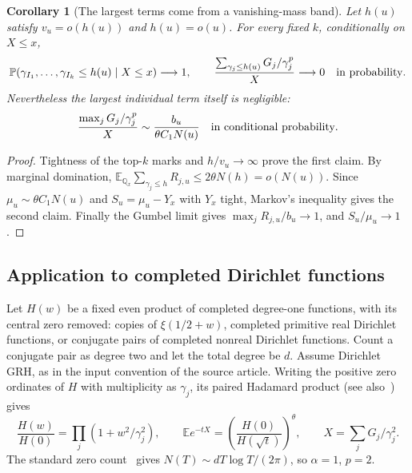 \documentclass[11pt]{article}
\newtheorem{corollary}[theorem]{Corollary}
\theoremstyle{definition}
\theoremstyle{remark}
\begin{document}
\begin{corollary}[The largest terms come from a vanishing-mass band]
\label{ext:cor:vanishingmass}
Let $h(u)$ satisfy $v_u=o(h(u))$ and $h(u)=o(u)$.  For every fixed $k$,
conditionally on $X\le x$,
\[
 \mathbb P(\gamma_{I_1},\ldots,\gamma_{I_k}\le h(u)\mid X\le x)
       \longrightarrow1,
 \qquad
 \frac{\sum_{\gamma_j\le h(u)}G_j/\gamma_j^p}{X}
       \longrightarrow0
 \quad\hbox{in probability}.
\]
Nevertheless the largest individual term itself is negligible:
\[
 \frac{\max_jG_j/\gamma_j^p}{X}
       \sim\frac{b_u}{\theta C_1N(u)}
 \quad\hbox{in conditional probability}.
\]
\end{corollary}

\begin{proof}
Tightness of the top-$k$ marks and $h/v_u\to\infty$ prove the first
claim.  By marginal domination,
$\mathbb E_{\mathbb Q_x}\sum_{\gamma_j\le h}R_{j,u}
 \le2\theta N(h)=o(N(u))$.
Since $\mu_u\sim\theta C_1N(u)$ and
$S_u=\mu_u-Y_x$ with $Y_x$ tight, Markov's inequality gives the second
claim.  Finally the Gumbel limit gives
$\max_jR_{j,u}/b_u\to1$, and $S_u/\mu_u\to1$.
\end{proof}

\subsection{Application to completed Dirichlet functions}

Let $H(w)$ be a fixed even product of completed degree-one functions,
with its central zero removed: copies of
$\xi(1/2+w)$, completed primitive real Dirichlet functions, or conjugate
pairs of completed nonreal Dirichlet functions.  Count a conjugate pair
as degree two and let the total degree be $d$.
Assume Dirichlet GRH, as in the input convention of the source article.
Writing the positive zero ordinates of $H$ with multiplicity as
$\gamma_j$, its paired Hadamard product (see also~\cite{Gao2003}) gives
\[
 \frac{H(w)}{H(0)}=\prod_j(1+w^2/\gamma_j^2),\qquad
 \mathbb E e^{-tX}=\left(\frac{H(0)}{H(\sqrt t)}\right)^\theta,
 \qquad X=\sum_jG_j/\gamma_j^2.
\]
The standard zero count~\cite{Bennett2021} gives
$N(T)\sim dT\log T/(2\pi)$, so $\alpha=1$, $p=2$.
\end{document}
